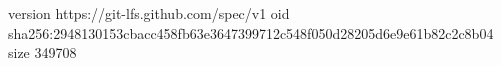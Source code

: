 version https://git-lfs.github.com/spec/v1
oid sha256:2948130153cbacc458fb63e3647399712c548f050d28205d6e9e61b82c2c8b04
size 349708

